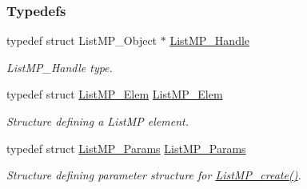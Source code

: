 \subsubsection*{Typedefs}
\begin{DoxyCompactItemize}
\item 
typedef struct List\-M\-P\-\_\-\-Object $\ast$ \hyperlink{_list_m_p_8h_abf5a0381ce9dab133382015abaf7fe6b}{List\-M\-P\-\_\-\-Handle}
\begin{DoxyCompactList}\small\item\em List\-M\-P\-\_\-\-Handle type. \end{DoxyCompactList}\item 
typedef struct \hyperlink{struct_list_m_p___elem}{List\-M\-P\-\_\-\-Elem} \hyperlink{_list_m_p_8h_a848cf7dfe687e86045808fca1c561ea0}{List\-M\-P\-\_\-\-Elem}
\begin{DoxyCompactList}\small\item\em Structure defining a List\-M\-P element. \end{DoxyCompactList}\item 
typedef struct \hyperlink{struct_list_m_p___params}{List\-M\-P\-\_\-\-Params} \hyperlink{_list_m_p_8h_ad2f3144c55c1f05df600bc6f37290b8f}{List\-M\-P\-\_\-\-Params}
\begin{DoxyCompactList}\small\item\em Structure defining parameter structure for \hyperlink{_list_m_p_8h_a71fdd7f30d377065fb70dd095a186d3e}{List\-M\-P\-\_\-create()}. \end{DoxyCompactList}\end{DoxyCompactItemize}
